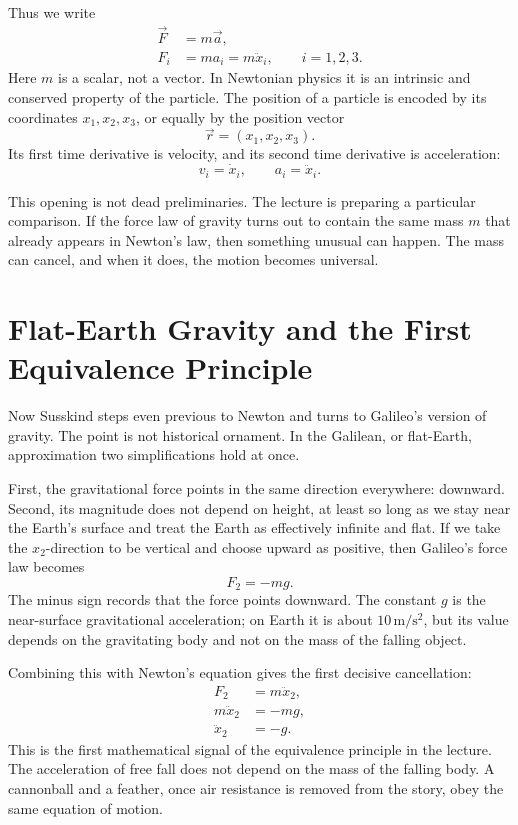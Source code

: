 Thus we write
\begin{align}
\vec F &= m\vec a, \\
F_i &= m a_i = m\ddot x_i, \qquad i=1,2,3.
\end{align}
Here \(m\) is a scalar, not a vector. In Newtonian physics it is an intrinsic and conserved property of the particle. The position of a particle is encoded by its coordinates \(x_1,x_2,x_3\), or equally by the position vector
\begin{equation}
\vec r=(x_1,x_2,x_3).
\end{equation}
Its first time derivative is velocity, and its second time derivative is acceleration:
\begin{equation}
v_i=\dot x_i, \qquad a_i=\ddot x_i.
\end{equation}

This opening is not dead preliminaries. The lecture is preparing a particular comparison. If the force law of gravity turns out to contain the same mass \(m\) that already appears in Newton's law, then something unusual can happen. The mass can cancel, and when it does, the motion becomes universal.

\section{Flat-Earth Gravity and the First Equivalence Principle}

Now Susskind steps even previous to Newton and turns to Galileo's version of gravity. The point is not historical ornament. In the Galilean, or flat-Earth, approximation two simplifications hold at once.

First, the gravitational force points in the same direction everywhere: downward. Second, its magnitude does not depend on height, at least so long as we stay near the Earth's surface and treat the Earth as effectively infinite and flat. If we take the \(x_2\)-direction to be vertical and choose upward as positive, then Galileo's force law becomes
\begin{equation}
F_2=-mg.
\end{equation}
The minus sign records that the force points downward. The constant \(g\) is the near-surface gravitational acceleration; on Earth it is about \(10\,\mathrm{m/s^2}\), but its value depends on the gravitating body and not on the mass of the falling object.

Combining this with Newton's equation gives the first decisive cancellation:
\begin{align}
F_2 &= m\ddot x_2, \\
m\ddot x_2 &= -mg, \\
\ddot x_2 &= -g.
\end{align}
This is the first mathematical signal of the equivalence principle in the lecture. The acceleration of free fall does not depend on the mass of the falling body. A cannonball and a feather, once air resistance is removed from the story, obey the same equation of motion.

